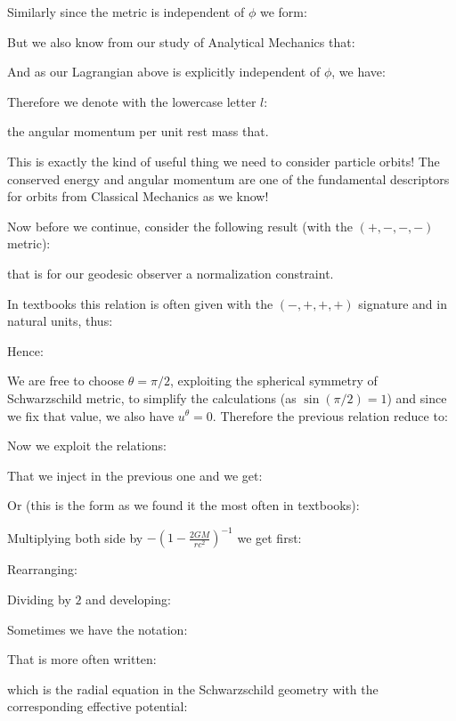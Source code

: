 	Similarly since the metric is independent of $\phi$ we form:
	
	But we also know from our study of Analytical Mechanics that:
	
	And as our Lagrangian above is explicitly independent of $\phi$, we have:
	
	Therefore we denote with the lowercase letter $l$:
	
	the angular momentum per unit rest mass that.
	
	This is exactly the kind of useful thing we need to consider particle orbits! The conserved energy and angular momentum are one of the fundamental descriptors for orbits from Classical Mechanics as we know!
	
	Now before we continue, consider the following result (with the $(+, -, -, -)$ metric):
	
	that is for our geodesic observer a normalization constraint.
	\begin{tcolorbox}[title=Remark,colframe=black,arc=10pt]
	In textbooks this relation is often given with the $(-, +, +, +)$ signature and in natural units, thus:
	
	\end{tcolorbox}
	
	Hence:
	
	We are free to choose $\theta=\pi/2$, exploiting the spherical symmetry of Schwarzschild metric, to simplify the calculations (as $\sin(\pi/2)=1$) and since we fix that value, we also have $u^\theta=0$. Therefore the previous relation reduce to:
	
	Now we exploit the relations:
	
	That we inject in the previous one and we get:
	
	Or (this is the form as we found it the most often in textbooks):
	
	Multiplying both side by $-\left(1-\frac{2GM}{rc^2}\right)^{-1}$ we get first:
	
	Rearranging:
	
	Dividing by $2$ and developing:
	
	\begin{tcolorbox}[title=Remark,colframe=black,arc=10pt]
	Sometimes we have the notation:
	
	\end{tcolorbox}
	That is more often written:
	
	which is the radial equation in the Schwarzschild geometry with the corresponding effective potential:
	

